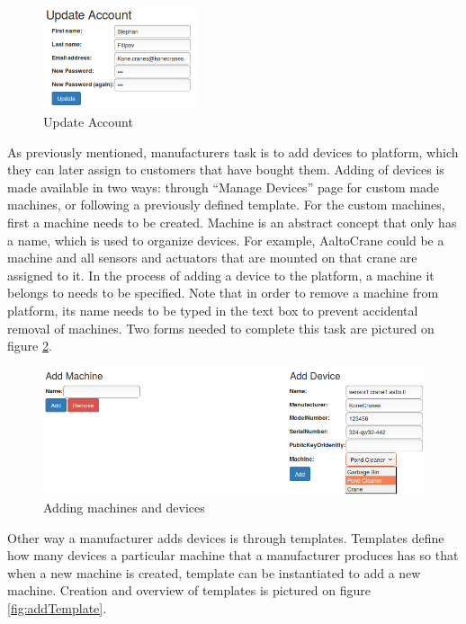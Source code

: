 \begin{figure}[ht]
	\begin{center}
		\includegraphics[width=0.4\textwidth]{images/implementation/UpdateAccount}
		\caption{Update Account}
		\label{fig:UpdateAccount}
	\end{center}
\end{figure}

As previously mentioned, manufacturers task is to add devices to platform, which they can later assign to customers that have bought them. Adding of devices is made available in two ways: through ``Manage Devices'' page for custom made machines, or following a previously defined template. For the custom machines, first a machine needs to be created. Machine is an abstract concept that only has a name, which is used to organize devices. For example, AaltoCrane could be a machine and all sensors and actuators that are mounted on that crane are assigned to it. In the process of adding a device to the platform, a machine it belongs to needs to be specified. Note that in order to remove a machine from platform, its name needs to be typed in the text box to prevent accidental removal of machines. Two forms needed to complete this task are pictured on figure \ref{fig:AddMachineDevice}. 

\begin{figure}[ht]
	\begin{center}
		\includegraphics[width=\textwidth]{images/implementation/AddMachineDevice}
		\caption{Adding machines and devices}
		\label{fig:AddMachineDevice}
	\end{center}
\end{figure}

Other way a manufacturer adds devices is through templates. Templates define how many devices a particular machine that a manufacturer produces has so that when a new machine is created, template can be instantiated to add a new machine. Creation and overview of templates is pictured on figure \ref{fig:addTemplate}. 

